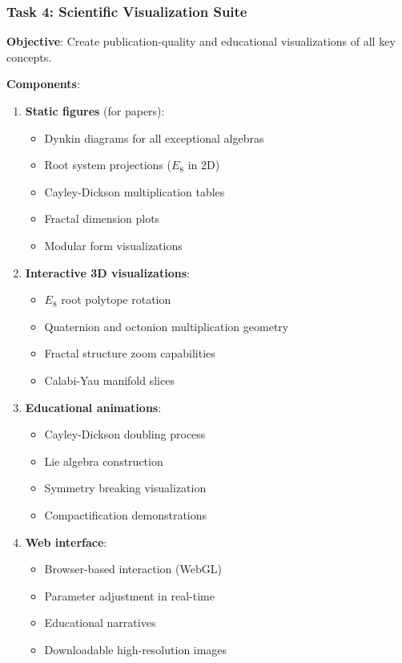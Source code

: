 \subsubsection{Task 4: Scientific Visualization Suite}

\textbf{Objective}: Create publication-quality and educational visualizations of all key concepts.

\textbf{Components}:
\begin{enumerate}
    \item \textbf{Static figures} (for papers):
    \begin{itemize}
        \item Dynkin diagrams for all exceptional algebras
        \item Root system projections ($E_8$ in 2D)
        \item Cayley-Dickson multiplication tables
        \item Fractal dimension plots
        \item Modular form visualizations
    \end{itemize}

    \item \textbf{Interactive 3D visualizations}:
    \begin{itemize}
        \item $E_8$ root polytope rotation
        \item Quaternion and octonion multiplication geometry
        \item Fractal structure zoom capabilities
        \item Calabi-Yau manifold slices
    \end{itemize}

    \item \textbf{Educational animations}:
    \begin{itemize}
        \item Cayley-Dickson doubling process
        \item Lie algebra construction
        \item Symmetry breaking visualization
        \item Compactification demonstrations
    \end{itemize}

    \item \textbf{Web interface}:
    \begin{itemize}
        \item Browser-based interaction (WebGL)
        \item Parameter adjustment in real-time
        \item Educational narratives
        \item Downloadable high-resolution images
    \end{itemize}
\end{enumerate}

